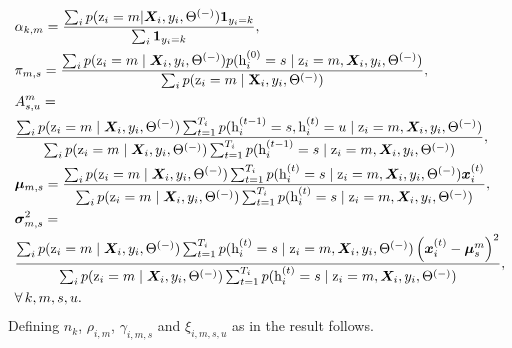 \begin{align}
	& \evalpha_{k,m} = \frac{\sum_i p(\rz_i=m |\mX_i,y_i,\Theta^{(-)}) \1_{y_i=k}}{\sum_i \1_{y_i=k}},\\
	& \evpi_{m,s} = \frac{\sum_i p(\rz_i=m \mid \mX_i,y_i,\Theta^{(-)}) p(\rh_i^{(0)}=s \mid \rz_i=m,\mX_i,y_i,\Theta^{(-)})}{\sum_i p(\rz_i=m \mid \rmX_i,y_i,\Theta^{(-)})}, \\
	\lefteqn{\emA^m_{s,u} =} \nonumber\\
	& \frac{\sum_i p(\rz_i=m \mid \mX_i,y_i,\Theta^{(-)}) \sum_{t=1}^{T_i} p(\rh_i^{(t-1)}=s, \rh_i^{(t)}=u \mid \rz_i=m,\mX_i,y_i,\Theta^{(-)})} {\sum_i p(\rz_i=m \mid \mX_i,y_i,\Theta^{(-)}) \sum_{t=1}^{T_i} p(\rh_i^{(t-1)}=s \mid \rz_i=m,\mX_i,y_i,\Theta^{(-)})}, \\
	& \vmu_{m,s} = \frac{\sum_i p(\rz_i=m \mid \mX_i,y_i,\Theta^{(-)}) \sum_{t=1}^{T_i} p(\rh_i^{(t)}=s \mid \rz_i=m,\mX_i,y_i,\Theta^{(-)}) \vx_i^{(t)}}{\sum_i p(\rz_i=m \mid \mX_i,y_i,\Theta^{(-)}) \sum_{t=1}^{T_i} p(\rh_i^{(t)}=s \mid \rz_i=m,\mX_i,y_i,\Theta^{(-)})}, \\
	\lefteqn{\vsigma^2_{m,s} =} \nonumber\\
	& \frac{\sum_i p(\rz_i=m \mid \mX_i,y_i,\Theta^{(-)}) \sum_{t=1}^{T_i} p(\rh_i^{(t)}=s \mid \rz_i=m,\mX_i,y_i,\Theta^{(-)}) \left(\vx_i^{(t)} - \boldsymbol{\mu}^m_s\right)^2}{\sum_i p(\rz_i=m \mid \mX_i,y_i,\Theta^{(-)}) \sum_{t=1}^{T_i} p(\rh_i^{(t)}=s \mid \rz_i=m,\mX_i,y_i,\Theta^{(-)})}, \\
	& \forall \, k,m,s,u. \nonumber
\end{align}
Defining $n_k$, $\rho_{i,m}$, $\gamma_{i,m,s}$ and $\xi_{i,m,s,u}$ as in  the result follows.

